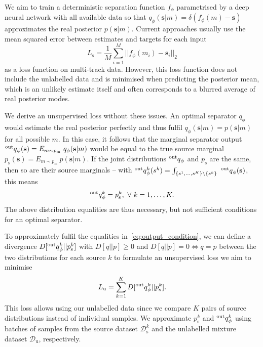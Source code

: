\documentclass{article}
\begin{document}
We aim to train a deterministic separation function $f_{\phi}$ parametrised by a deep neural network with all available data so that $q_{\phi}(\mathbf{s}|m) = \delta(f_{\phi}(m) - \mathbf{s})$ approximates the real posterior $p(\mathbf{s}|m)$.
Current approaches usually use the mean squared error between estimates and targets for each input
\begin{equation} 
L_{\text{s}} = \frac{1}{M} \sum_{i=1}^{M} || f_{\phi}(m_i) - \mathbf{s}_i ||_2
\end{equation}
as a loss function on multi-track data.
However, this loss function does not include the unlabelled data and is minimised when predicting the posterior mean, which is an unlikely estimate itself and often corresponds to a blurred average of real posterior modes.

We derive an unsupervised loss without these issues.
An optimal separator $q_{\phi}$ would estimate the real posterior perfectly and thus fulfil $q_{\phi}(\mathbf{s}|m) = p(\mathbf{s}|m)$ for all possible $m$.
In this case, it follows that the marginal separator output $\prescript{\text{out}}{}{q}_{\phi}(\mathbf{s}) = E_{m \sim p_{\text{m}}}\ q_{\phi}(\mathbf{s}|m)$ would be equal to the true source marginal $p_{\text{s}}(\mathbf{s}) = E_{m \sim p_{\text{m}}}\ p(\mathbf{s}|m)$.
If the joint distributions $\prescript{\text{out}}{}{q}_{\phi}$ and $p_{\text{s}}$ are the same, then so are their source marginals -- with $\prescript{\text{out}}{}{q}^{k}_{\phi}(s^k) = \int_{\{s^1,\ldots,s^K\}\setminus\{s^k\}}\ \prescript{\text{out}}{}{q}_{\phi}(\mathbf{s})$, this means
\begin{equation}
\label{eq:output_condition}
\prescript{\text{out}}{}{q}^{k}_{\phi} = p^k_{\text{s}},\ \forall\ k=1,\ldots,K.
\end{equation}
The above distribution equalities are thus necessary, but not sufficient conditions for an optimal separator.

To approximately fulfil the equalities in~\eqref{eq:output_condition}, we can define a divergence $D[\prescript{\text{out}}{}{q}^k_{\phi} || p^k_{\text{s}}]$ with $D[q||p] \geq 0$ and ${D[q||p] = 0} \Leftrightarrow {q = p}$ between the two distributions for each source $k$ to formulate an unsupervised loss we aim to minimise
\begin{equation}
L_{\text{u}} = \sum_{k=1}^K D[\prescript{\text{out}}{}{q}^k_{\phi} || p^k_{\text{s}}].
\end{equation}
This loss allows using our unlabelled data since we compare $K$ pairs of source distributions instead of individual samples.
We approximate $p^k_{\text{s}}$ and $\prescript{\text{out}}{}{q}^k_{\phi}$ using batches of samples from the source dataset $\mathcal{D}_{\text{s}}^k$ and the unlabelled mixture dataset $\mathcal{D}_{\text{u}}$, respectively. 
\end{document}
